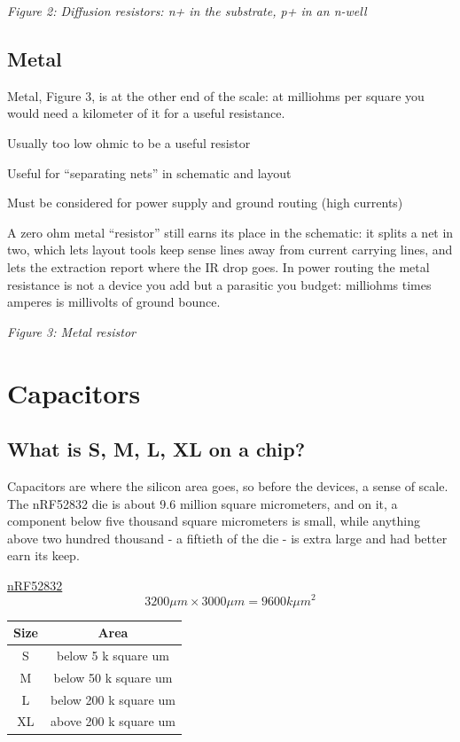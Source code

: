 {
\centering
{}
}

\emph{Figure 2: Diffusion resistors: n+ in the substrate, p+ in an
n-well}

\subsection{Metal}\label{metal}

Metal, Figure 3, is at the other end of the scale: at milliohms per
square you would need a kilometer of it for a useful resistance.

Usually too low ohmic to be a useful resistor

Useful for ``separating nets'' in schematic and layout

Must be considered for power supply and ground routing (high currents)

A zero ohm metal ``resistor'' still earns its place in the schematic: it
splits a net in two, which lets layout tools keep sense lines away from
current carrying lines, and lets the extraction report where the IR drop
goes. In power routing the metal resistance is not a device you add but
a parasitic you budget: milliohms times amperes is millivolts of ground
bounce.


{
\centering
{}
}

\emph{Figure 3: Metal resistor}

\section{Capacitors}\label{capacitors}

\subsection{What is S, M, L, XL on a
chip?}\label{what-is-s-m-l-xl-on-a-chip}

Capacitors are where the silicon area goes, so before the devices, a
sense of scale. The nRF52832 die is about 9.6 million square
micrometers, and on it, a component below five thousand square
micrometers is small, while anything above two hundred thousand - a
fiftieth of the die - is extra large and had better earn its keep.

\href{https://www.nordicsemi.com/products/nrf52832}{nRF52832}
\[ 3200 \mu m \times 3000 \mu m = 9600 k \mu m^2\]

\begin{longtable}[]{@{}cc@{}}
\toprule\noalign{}
Size & Area \\
\midrule\noalign{}
\endhead
\bottomrule\noalign{}
\endlastfoot
S & below 5 k square um \\
M & below 50 k square um \\
L & below 200 k square um \\
XL & above 200 k square um \\
\end{longtable}

